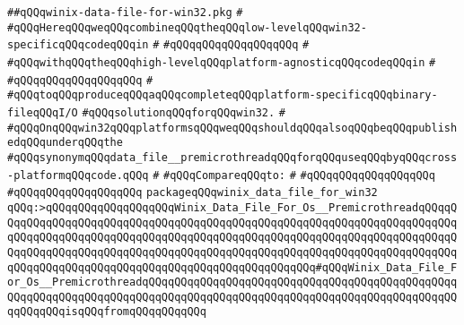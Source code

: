 \label{src/lib/std/src/win32/winix-data-file-for-win32.pkg}
\verb|##qQQqwinix-data-file-for-win32.pkg|\newline
\verb|#|\newline
\verb|#qQQqHereqQQqweqQQqcombineqQQqtheqQQqlow-levelqQQqwin32-specificqQQqcodeqQQqin|\newline
\verb|#|\newline
\verb|#qQQqqQQqqQQqqQQqqQQq|\newline
\verb|#|\newline
\verb|#qQQqwithqQQqtheqQQqhigh-levelqQQqplatform-agnosticqQQqcodeqQQqin|\newline
\verb|#|\newline
\verb|#qQQqqQQqqQQqqQQqqQQq|\newline
\verb|#|\newline
\verb|#qQQqtoqQQqproduceqQQqaqQQqcompleteqQQqplatform-specificqQQqbinary-fileqQQqI/O|\newline
\verb|#qQQqsolutionqQQqforqQQqwin32.|\newline
\verb|#|\newline
\verb|#qQQqOnqQQqwin32qQQqplatformsqQQqweqQQqshouldqQQqalsoqQQqbeqQQqpublishedqQQqunderqQQqthe|\newline
\verb|#qQQqsynonymqQQqdata_file__premicrothreadqQQqforqQQquseqQQqbyqQQqcross-platformqQQqcode.qQQq|\newline
\verb|#|\newline
\verb|#qQQqCompareqQQqto:|\newline
\verb|#|\newline
\verb|#qQQqqQQqqQQqqQQqqQQq|\newline
\verb|#qQQqqQQqqQQqqQQqqQQq|\newline
\newline
\verb|packageqQQqwinix_data_file_for_win32|\newline
\verb|qQQq:>qQQqqQQqqQQqqQQqqQQqWinix_Data_File_For_Os__PremicrothreadqQQqqQQqqQQqqQQqqQQqqQQqqQQqqQQqqQQqqQQqqQQqqQQqqQQqqQQqqQQqqQQqqQQqqQQqqQQqqQQqqQQqqQQqqQQqqQQqqQQqqQQqqQQqqQQqqQQqqQQqqQQqqQQqqQQqqQQqqQQqqQQqqQQqqQQqqQQqqQQqqQQqqQQqqQQqqQQqqQQqqQQqqQQqqQQqqQQqqQQqqQQqqQQqqQQqqQQqqQQqqQQqqQQqqQQqqQQqqQQqqQQqqQQqqQQqqQQqqQQqqQQq#qQQqWinix_Data_File_For_Os__PremicrothreadqQQqqQQqqQQqqQQqqQQqqQQqqQQqqQQqqQQqqQQqqQQqqQQqqQQqqQQqqQQqqQQqqQQqqQQqqQQqqQQqqQQqqQQqqQQqqQQqqQQqqQQqqQQqqQQqqQQqqQQqqQQqqQQqisqQQqfromqQQqqQQqqQQq|\newline
